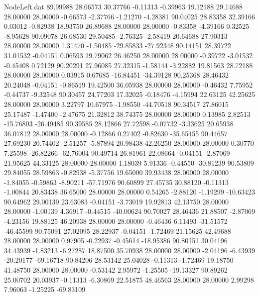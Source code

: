 \begin{filecontents}{NodeLeft.dat}
  89.99988   28.66573   30.37766    -0.11313   -0.39963   19.12188   29.14688   28.00000   28.00000   -0.66573   -2.37766   -1.21270   -4.28381
  90.04025   28.83358   32.39166     0.03012   -0.82938   18.93750   26.89688   28.00000   28.00000   -0.83358   -4.39166    0.32525   -8.95628
  90.09078   26.68530   29.50485    -2.76325   -2.58419   20.64688   27.90313   28.00000   28.00000    1.31470   -1.50485  -29.85833  -27.92348
  90.14151   28.39722   31.01532    -0.04151    0.06593   19.79062   26.46250   28.00000   28.00000   -0.39722   -3.01532   -0.45408    0.72129
  90.20291   27.96085   27.32315    -1.58144   -3.22882   19.81563   28.72188   28.00000   28.00000    0.03915    0.67685  -16.84451  -34.39128
  90.25368   28.46432   20.24048    -0.04151   -0.86519   19.42500   36.05938   28.00000   28.00000   -0.46432    7.75952   -0.44737   -9.32548
  90.30457   24.77203   17.32025    -0.18476   -4.15994   22.63125   42.25625   28.00000   28.00000    3.22797   10.67975   -1.98550  -44.70518
  90.34517   27.86015   25.17487    -1.47400   -2.47675   21.32812   38.74375   28.00000   28.00000    0.13985    2.82513  -15.76803  -26.49485
  90.39585   28.12866   27.72598    -0.07732   -3.33625   20.65938   36.07812   28.00000   28.00000   -0.12866    0.27402   -0.82630  -35.65455
  90.44657   27.69230   20.74402    -2.51257   -5.87894   20.98438   42.26250   28.00000   28.00000    0.30770    7.25598  -26.82266  -62.76004
  90.49714   26.81961   22.08664    -0.04151   -2.87069   21.95625   44.33125   28.00000   28.00000    1.18039    5.91336   -0.44550  -30.81239
  90.53809   29.84055   28.59863    -0.82938   -5.37756   19.65000   39.93438   28.00000   28.00000   -1.84055   -0.59863   -8.90211  -57.71976
  90.60899   27.45735   30.88120    -0.11313   -1.00844   20.83438   36.65000   28.00000   28.00000    0.54265   -2.88120   -1.19299  -10.63423
  90.64962   29.00139   23.63083    -0.04151   -3.73019   19.92813   42.13750   28.00000   28.00000   -1.00139    4.36917   -0.44515  -40.00624
  90.70027   28.46436   21.88507    -2.87069   -4.23156   19.88125   46.20938   28.00000   28.00000   -0.46436    6.11493  -31.51572  -46.45599
  90.75091   27.02095   28.22937    -0.04151   -1.72469   21.15625   42.49688   28.00000   28.00000    0.97905   -0.22937   -0.45614  -18.95386
  90.80151   30.04196   34.43939    -1.83213   -6.27287   18.87500   35.70938   28.00000   28.00000   -2.04196   -6.43939  -20.20177  -69.16718
  90.84206   28.53142   25.04028    -0.11313   -1.72469   19.18750   41.48750   28.00000   28.00000   -0.53142    2.95972   -1.25505  -19.13327
  90.89262   25.00702   20.03937    -0.11313   -6.30869   22.51875   48.46563   28.00000   28.00000    2.99298    7.96063   -1.25225  -69.83109

\end{filecontents}
